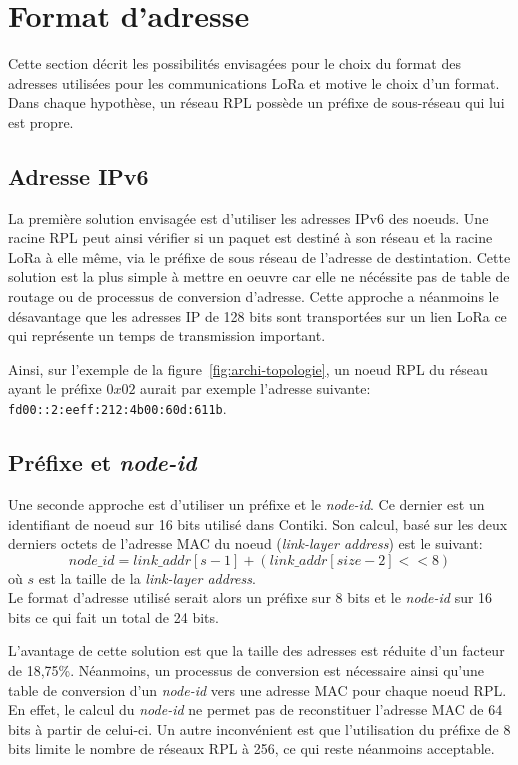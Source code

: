 \section{Format d'adresse}\label{sec:archi-adresses}
\renewcommand{\rightmark}{Format d'adresse}

Cette section décrit les possibilités envisagées pour le choix du format des adresses utilisées pour les communications LoRa et motive le choix d'un format. Dans chaque hypothèse, un réseau RPL possède un préfixe de sous-réseau qui lui est propre.

\subsection*{Adresse IPv6}
    La première solution envisagée est d'utiliser les adresses IPv6 des noeuds.
    Une racine RPL peut ainsi vérifier si un paquet est destiné à son réseau et la racine LoRa à elle même,
    via le préfixe de sous réseau de l'adresse de destintation.
    Cette solution est la plus simple à mettre en oeuvre car elle ne nécéssite pas de table de routage ou de processus de conversion d'adresse. Cette approche a néanmoins le désavantage que les adresses IP de 128 bits sont transportées sur un lien LoRa ce qui représente un temps de transmission important.

    Ainsi, sur l'exemple de la figure~\ref{fig:archi-topologie}, un noeud RPL du réseau ayant le préfixe $0x02$ aurait par exemple l'adresse suivante:\newline 
    \texttt{fd00::2:eeff:212:4b00:60d:611b}.
    
\subsection*{Préfixe et \textit{node-id}}
    Une seconde approche est d'utiliser un préfixe et le \textit{node-id}. Ce dernier est un identifiant de noeud sur 16 bits utilisé dans Contiki. Son calcul, basé sur les deux derniers octets de l'adresse MAC du noeud (\textit{link-layer address}) est le suivant:
    \[
        node\_id = link\_addr[s-1] + (link\_addr[size -2] << 8)
    \]
    où $s$ est la taille de la \textit{link-layer address}.\\

    Le format d'adresse utilisé serait alors un préfixe sur 8 bits et le \textit{node-id} sur 16 bits ce qui fait un total de 24 bits.

    L'avantage de cette solution est que la taille des adresses est réduite d'un facteur de 18,75\%. Néanmoins, un processus de conversion est nécessaire ainsi qu'une table de conversion d'un \textit{node-id} vers une adresse MAC pour chaque noeud RPL. En effet, le calcul du \textit{node-id} ne permet pas de reconstituer l'adresse MAC de 64 bits à partir de celui-ci.
    Un autre inconvénient est que l'utilisation du préfixe de 8 bits limite le nombre de réseaux RPL à 256, ce qui reste néanmoins acceptable.

